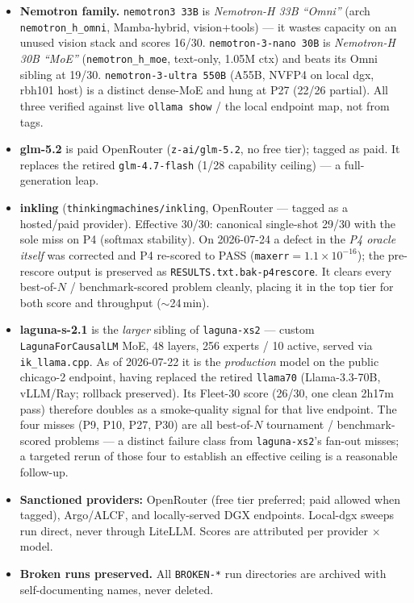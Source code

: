 \documentclass[11pt]{article}
\begin{document}
\begin{itemize}
\item \textbf{Nemotron family.} \texttt{nemotron3 33B} is \emph{Nemotron-H 33B
  ``Omni''} (arch \texttt{nemotron\_h\_omni}, Mamba-hybrid, vision+tools) --- it wastes
  capacity on an unused vision stack and scores 16/30. \texttt{nemotron-3-nano 30B} is
  \emph{Nemotron-H 30B ``MoE''} (\texttt{nemotron\_h\_moe}, text-only, 1.05M ctx) and
  beats its Omni sibling at 19/30. \texttt{nemotron-3-ultra 550B} (A55B, NVFP4 on
  local dgx, rbh101 host) is a distinct dense-MoE and hung at P27 (22/26 partial).
  All three verified against live \texttt{ollama show} / the local endpoint map, not
  from tags.
\item \textbf{glm-5.2} is paid OpenRouter (\texttt{z-ai/glm-5.2}, no free tier);
  tagged as paid. It replaces the retired \texttt{glm-4.7-flash} (1/28 capability
  ceiling) --- a full-generation leap.
\item \textbf{inkling} (\texttt{thinkingmachines/inkling}, OpenRouter --- tagged as a
  hosted/paid provider). Effective 30/30: canonical single-shot 29/30 with the sole
  miss on P4 (softmax stability). On 2026-07-24 a defect in the \emph{P4 oracle
  itself} was corrected and P4 re-scored to PASS (\texttt{maxerr}${=}1.1{\times}10^{-16}$);
  the pre-rescore output is preserved as \texttt{RESULTS.txt.bak-p4rescore}. It clears
  every best-of-$N$ / benchmark-scored problem cleanly, placing it in the top tier for
  both score and throughput ($\sim$24\,min).
\item \textbf{laguna-s-2.1} is the \emph{larger} sibling of \texttt{laguna-xs2} ---
  custom \texttt{LagunaForCausalLM} MoE, 48 layers, 256 experts / 10 active, served
  via \texttt{ik\_llama.cpp}. As of 2026-07-22 it is the \emph{production} model on the
  public chicago-2 endpoint, having replaced the retired \texttt{llama70}
  (Llama-3.3-70B, vLLM/Ray; rollback preserved). Its Fleet-30 score (26/30, one clean
  2h17m pass) therefore doubles as a smoke-quality signal for that live endpoint. The
  four misses (P9, P10, P27, P30) are all best-of-$N$ tournament / benchmark-scored
  problems --- a distinct failure class from \texttt{laguna-xs2}'s fan-out misses; a
  targeted rerun of those four to establish an effective ceiling is a reasonable
  follow-up.
\item \textbf{Sanctioned providers:} OpenRouter (free tier preferred; paid allowed
  when tagged), Argo/ALCF, and locally-served DGX endpoints. Local-dgx sweeps run direct, never
  through LiteLLM. Scores are attributed per provider $\times$ model.
\item \textbf{Broken runs preserved.} All \texttt{BROKEN-*} run directories are
  archived with self-documenting names, never deleted.
\end{itemize}
\end{document}
